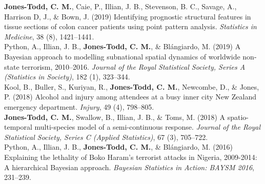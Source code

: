 \documentclass[10pt,a4paper]{moderncv}
\begin{document}
\vspace{-3pt}
 \textbf{Jones-Todd, C. M.}, Caie, P., Illian, J. B., Stevenson, B. C., Savage, A., Harrison D, J., \& Bown, J. (2019) Identifying prognostic structural features in tissue sections of colon cancer patients using point pattern analysis. \textit{Statistics in Medicine}, 38 (8), 1421--1441.\\

\vspace{-3pt}
 Python, A.,  Illian, J. B., \textbf{Jones-Todd, C. M.}, \& Bl\'{a}ngiardo, M. (2019) A Bayesian approach to modelling subnational spatial dynamics of worldwide non-state terrorism, 2010--2016. \textit{Journal of the Royal Statistical Society, Series  A (Statistics in Society)}, 182 (1), 323--344.\\

\vspace{-3pt}
Kool, B., Buller, S., Kuriyan, R., \textbf{Jones-Todd, C. M.}, Newcombe, D., \& Jones, P. (2018) Alcohol and injury among attendees at a busy inner city New Zealand emergency department. \textit{Injury}, 49 (4), 798--805.\\


 \textbf{Jones-Todd, C. M.}, Swallow, B., Illian, J. B., \& Toms, M. (2018) A spatio-temporal multi-species model of a semi-continuous response. \textit{Journal of the Royal Statistical Society, Series C (Applied Statistics)}, 67 (3), 705--722.\\

\vspace{-3pt}
Python, A.,  Illian, J. B., \textbf{Jones-Todd, C. M.}, \& Bl\'{a}ngiardo, M. (2016) Explaining the lethality of Boko Haram’s terrorist attacks in Nigeria, 2009-2014: A hierarchical Bayesian approach. \textit{Bayesian Statistics in Action: BAYSM 2016}, 231--239.\\





\end{document}
